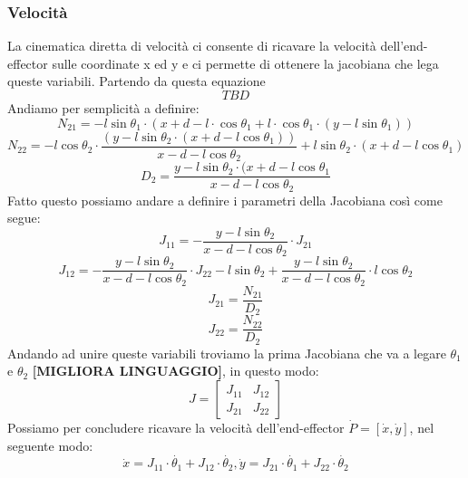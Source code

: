 \subsubsection{Velocità}\label{sec:CalcoloVelCin}
La cinematica diretta di velocità ci consente di ricavare la velocità dell'end-effector sulle coordinate x ed y e ci permette di ottenere la jacobiana che lega queste variabili. Partendo da questa equazione
\begin{equation}
    TBD
\end{equation}
Andiamo per semplicità a definire:
\begin{equation*}
    N_{21} = -l\sin\theta_1\cdot (x+d-l\cdot \cos\theta_1 + l\cdot \cos\theta_1\cdot (y-l\sin\theta_1))
\end{equation*}
\begin{equation*}
    N_{22} = -l\cos\theta_2\cdot \frac{(y-l\sin\theta_2\cdot (x+d-l\cos\theta_1))}{x-d-l \cos\theta_2} +l\sin\theta_2\cdot(x+d-l\cos\theta_1)
\end{equation*}
\begin{equation*}
 D_2 = \frac{y-l\sin\theta_2\cdot (x+d-l\cos\theta_1}{x-d-l\cos\theta_2}
\end{equation*}
Fatto questo possiamo andare a definire i parametri della Jacobiana così come segue:
\begin{equation*}
    J_{11} = -\frac{y-l\sin\theta_2}{x-d-l\cos\theta_2}\cdot J_{21}
\end{equation*}
\begin{equation*}
    J_{12} = -\frac{y-l\sin\theta_2}{x-d-l\cos\theta_2}\cdot J_{22} - l\sin\theta_2 + \frac{y-l\sin\theta_2}{x-d-l\cos\theta_2}\cdot l\cos\theta_2
\end{equation*}
\begin{equation*}
    J_{21} = \frac{N_{21}}{D_2}
\end{equation*}
\begin{equation*}
    J_{22} = \frac{N_{22}}{D_2}
\end{equation*}
Andando ad unire queste variabili troviamo la prima Jacobiana che va a legare $\theta_1$ e $\theta_2$ \textbf{[MIGLIORA LINGUAGGIO]}, in questo modo:
\begin{equation}
    J = \begin{bmatrix}
    J_{11} & J_{12} \\ J_{21} & J_{22}
    \end{bmatrix}
    \label{eq:J12}
\end{equation}
Possiamo per concludere ricavare la velocità dell'end-effector $\dot{P} = [\dot{x},\dot{y}]$, nel seguente modo:
\begin{equation}
    \dot{x} = J_{11}\cdot \dot{\theta_1} + J_{12}\cdot\dot{\theta_2}, \dot{y} = J_{21}\cdot \dot{\theta_1}+J_{22}\cdot\dot{\theta_2}
\end{equation}
